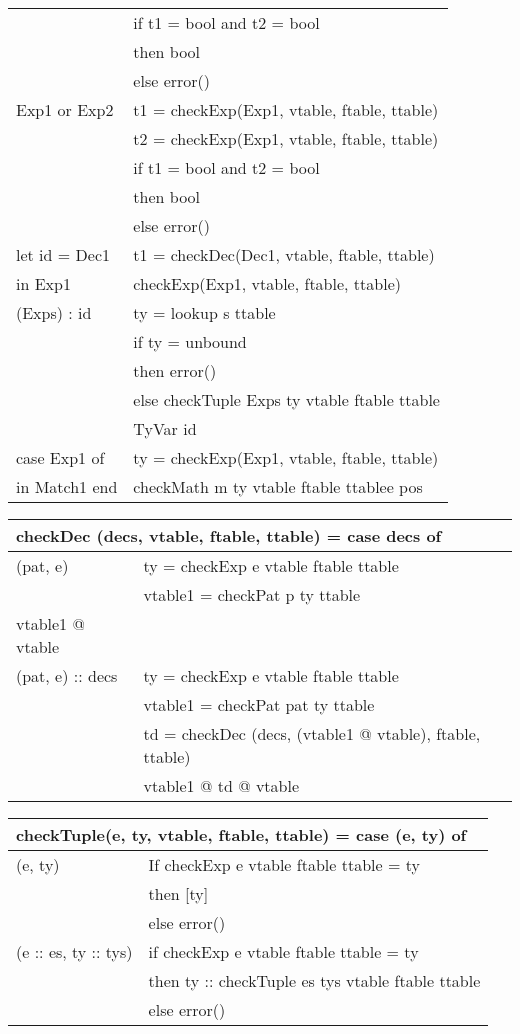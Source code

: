 \documentclass [10pt,a4paper]{article}
\begin{document}
\begin{tabular}{|l|l|}
  & if t1 = bool and t2 = bool \\
  & then bool \\
  & else error() \\ \hline
  Exp1 or Exp2 & t1 = checkExp(Exp1, vtable, ftable, ttable) \\
  & t2 = checkExp(Exp1, vtable, ftable, ttable) \\ 
  & if t1 = bool and t2 = bool \\
  & then bool \\
  & else error() \\ \hline
  let id = Dec1 & t1 = checkDec(Dec1, vtable, ftable, ttable) \\
  in Exp1 & checkExp(Exp1, vtable, ftable, ttable) \\ \hline
  (Exps) : id & ty = lookup s ttable \\
  & if ty = unbound \\
  & then error() \\
  & else checkTuple Exps ty vtable ftable ttable \\
  & TyVar id \\ \hline
  case Exp1 of & ty = checkExp(Exp1, vtable, ftable, ttable) \\
  in Match1 end & checkMath m ty vtable ftable ttablee pos \\ \hline
\end{tabular}

\begin{tabular}{|l|l|}
  \hline
  \multicolumn{2}{|l|}{checkDec (decs, vtable, ftable, ttable) = case
    decs of} \\ \hline
  (pat, e) & ty = checkExp e vtable ftable ttable \\
  & vtable1 = checkPat p ty ttable \\
  vtable1 @ vtable & \\ \hline
  (pat, e) :: decs & ty = checkExp e vtable ftable ttable \\
  & vtable1 = checkPat pat ty ttable \\
  & td = checkDec (decs, (vtable1 @ vtable), ftable, ttable) \\
  & vtable1 @ td @ vtable \\ \hline
\end{tabular}

\begin{tabular}{|l|l|}
  \hline
  \multicolumn{2}{|l|}{checkTuple(e, ty, vtable, ftable, ttable) = case (e, ty) of} \\ \hline
  	(e, ty) & If checkExp e vtable ftable ttable = ty \\
            & then [ty] \\
        	& else error() \\ 
			\hline
	(e :: es, ty :: tys) & if checkExp e vtable ftable ttable  = ty \\
			        	 & then ty :: checkTuple es tys vtable ftable ttable \\
			             & else error() \\ \hline
\end{tabular}
\end{document}
